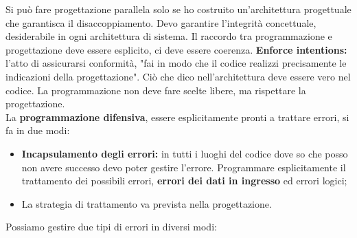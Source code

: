 Si può fare progettazione parallela solo se ho costruito un'architettura progettuale che garantisca il disaccoppiamento. Devo garantire l'integrità concettuale, desiderabile in ogni architettura di sistema. Il raccordo tra programmazione e progettazione deve essere esplicito, ci deve essere coerenza. \textbf{Enforce intentions:} l'atto di assicurarsi conformità, "fai in modo che il codice realizzi precisamente le indicazioni della progettazione". Ciò che dico nell'architettura deve essere vero nel codice. La programmazione non deve fare scelte libere, ma rispettare la progettazione.\\
La \textbf{programmazione difensiva}, essere esplicitamente pronti a trattare errori, si fa in due modi:

\begin{itemize}

	\item \textbf{Incapsulamento degli errori:} in tutti i luoghi del codice dove so che posso non avere successo devo poter gestire l'errore. Programmare esplicitamente il trattamento dei possibili errori, \textbf{errori dei dati in ingresso} ed errori logici;
	\item La strategia di trattamento va prevista nella progettazione.

\end{itemize}
Possiamo gestire due tipi di errori in diversi modi:
